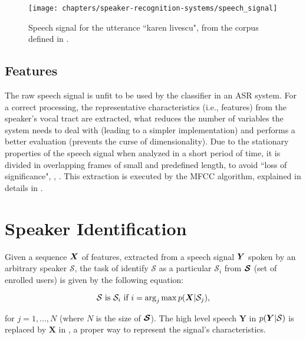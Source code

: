 \begin{figure}[ht]
    \centering
    \texttt{[image: chapters/speaker-recognition-systems/speech\_signal]}
    \caption{Speech signal for the utterance ``karen livescu", from the corpus defined in .}
    \label{fig:speech_signal}
\end{figure}

\subsection{Features}

The raw speech signal is unfit to be used by the classifier in an ASR system. For a correct processing, the representative characteristics (i.e., features) from the speaker's vocal tract are extracted, what reduces the number of variables the system needs to deal with (leading to a simpler implementation) and performs a better evaluation (prevents the curse of dimensionality). Due to the stationary properties of the speech signal when analyzed in a short period of time, it is divided in overlapping frames of small and predefined length, to avoid ``loss of significance", , . This extraction is executed by the MFCC algorithm, explained in details in .

\section{Speaker Identification}
\label{sec:speaker-identification}

Given a sequence $\boldsymbol{X}$ of features, extracted from a speech signal $\boldsymbol{Y}$ spoken by an arbitrary speaker $\mathcal{S}$, the task of identify $\mathcal{S}$ as a particular $\mathcal{S}_i$ from $\boldsymbol{\mathcal{S}}$ (set of enrolled users) is given by the following equation:

\begin{equation}
    \mathcal{S} \text{ is } \mathcal{S}_i \text{ if } i = \arg_j\max\postpdf{\boldsymbol{X}}{\mathcal{S}_j},
    \label{eq:classification_speaker_identification}
\end{equation}

\noindent for $j = 1, ..., N$ (where $N$ is the size of $\boldsymbol{\mathcal{S}}$). The high level speech $\boldsymbol{Y}$ in $p(\boldsymbol{Y}|\mathcal{S})$ is replaced by $\boldsymbol{X}$ in , a proper way to represent the signal's characteristics.

